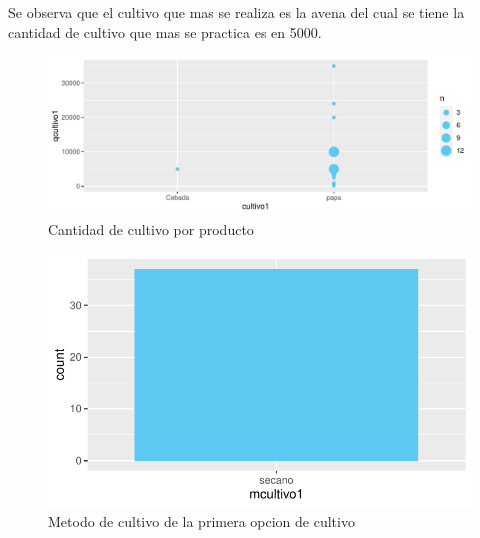 \documentclass[12pt]{article}\usepackage[]{graphicx}\usepackage[]{xcolor}
\makeatletter
\def\maxwidth{ %
  \ifdim\Gin@nat@width>\linewidth
    \linewidth
  \else
    \Gin@nat@width
  \fi
}
\newenvironment{knitrout}{}{} %
\makeatother
\begin{document}
	Se observa que el cultivo que mas se realiza es la avena del cual se tiene la cantidad de cultivo que mas se practica es en 5000.
	\begin{figure}[H]
	\centering
\begin{knitrout}
\color{fgcolor}
\includegraphics[width=\maxwidth]{figure/oneh-1} 
\end{knitrout}
	\caption{Cantidad de cultivo por producto}
	\end{figure}
	
	\begin{figure}[H]
	\centering
\begin{knitrout}
\color{fgcolor}
\includegraphics[width=\maxwidth]{figure/twelve-1} 
\end{knitrout}
	\caption{Metodo de cultivo de la primera opcion de cultivo}
	\end{figure}
	
\end{document}
